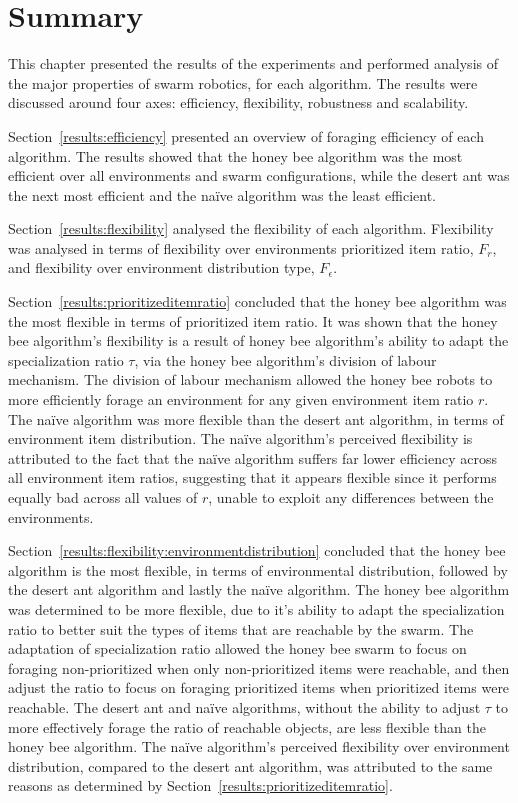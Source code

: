\section{Summary}
\label{results:summary}

This chapter presented the results of the experiments and performed analysis of the major properties of swarm robotics, for each algorithm. The results were discussed around four axes: efficiency, flexibility, robustness and scalability. 

Section~\ref{results:efficiency} presented an overview of foraging efficiency of each algorithm. The results showed that the honey bee algorithm was the most efficient over all environments and swarm configurations, while the desert ant was the next most efficient and the na\"ive algorithm was the least efficient.

Section~\ref{results:flexibility} analysed the flexibility of each algorithm. Flexibility was analysed in terms of flexibility over environments prioritized item ratio, $F_r$, and flexibility over environment distribution type, $F_\epsilon$. 

Section~\ref{results:prioritizeditemratio} concluded that the honey bee algorithm was the most flexible in terms of prioritized item ratio. It was shown that the honey bee algorithm's flexibility is a result of honey bee algorithm's ability to adapt the specialization ratio $\tau$, via the honey bee algorithm's division of labour mechanism. The division of labour mechanism allowed the honey bee robots to more efficiently forage an environment for any given environment item ratio $r$. The na\"ive algorithm was more flexible than the desert ant algorithm, in terms of environment item distribution. The na\"ive algorithm's perceived flexibility is attributed to the fact that the na\"ive algorithm suffers far lower efficiency across all environment item ratios, suggesting that it appears flexible since it performs equally bad across all values of $r$, unable to exploit any differences between the environments. 

Section~\ref{results:flexibility:environmentdistribution} concluded that the honey bee algorithm is the most flexible, in terms of environmental distribution, followed by the desert ant algorithm and lastly the na\"ive algorithm. The honey bee algorithm was determined to be more flexible, due to it's ability to adapt the specialization ratio to better suit the types of items that are reachable by the swarm. The adaptation of specialization ratio allowed the honey bee swarm to focus on foraging non-prioritized when only non-prioritized items were reachable, and then adjust the ratio to focus on foraging prioritized items when prioritized items were reachable. The desert ant and na\"ive algorithms, without the ability to adjust $\tau$ to more effectively forage the ratio of reachable objects, are less flexible than the honey bee algorithm.
  The na\"ive algorithm's perceived flexibility over environment distribution, compared to the desert ant algorithm, was attributed to the same reasons as determined by Section~\ref{results:prioritizeditemratio}. 
  
